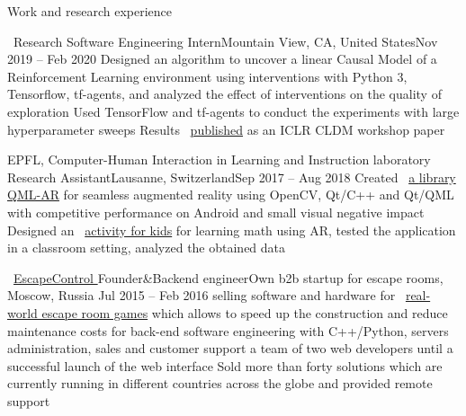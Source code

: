 \documentclass{resume} %
\newcommand*{\img}[1]{%
	\raisebox{-.02\baselineskip}{%
		\texttt{[image: \#1]}%
	}%
}
\newcommand*{\emoji}[1]{\img{./emoji/\imgpref#1.png}}
\newcommand*{\mybold}[1]{{\color{pinkunderline} #1}}
\def\imgpref{bleak-}
\newcommand{\mylink}{{\color{gray}\faExternalLink}}
\begin{document}
\begin{rSection}{Work and research experience}
	\begin{rSubsection}{{\large\vspace*{-0.7mm}\google}\ Research \emoji{flag-us}}{Software Engineering Intern}{Mountain View, CA, United States}{Nov 2019 -- Feb 2020}
		\myitem Designed an algorithm to uncover a linear \mybold{Causal Model} of a \mybold{Reinforcement Learning} environment using interventions with \mybold{Python 3, Tensorflow, tf-agents}, and analyzed the effect of interventions on the quality of exploration
		\myitem Used TensorFlow and tf-agents to conduct the experiments with large hyperparameter sweeps
		\myitem Results \mylink~\href{https://arxiv.org/abs/2002.05217}{published} as an ICLR CLDM workshop paper
	\end{rSubsection}

	\begin{rSubsection}{EPFL, Computer-Human Interaction in Learning and Instruction laboratory \emoji{flag-ch}}{Research Assistant}{Lausanne, Switzerland}{Sep 2017 -- Aug 2018}
		\myitem Created \mylink~\href{https://github.com/chili-epfl/qml-ar}{a \mybold{library} QML-AR} for seamless \mybold{augmented reality} using \mybold{OpenCV, Qt/C++ and Qt/QML} with competitive performance on Android and small visual negative impact
		\myitem Designed an \mylink~\href{https://youtu.be/B4-2qYsAKH4}{activity for kids} for learning math using AR, tested the application in a classroom setting, analyzed the obtained data
	\end{rSubsection}


	\begin{rSubsection}{\mylink~\href{http://escape-control.com}{EscapeControl \emoji{old-key}}}{Founder\&Backend engineer}{Own b2b startup for escape rooms, Moscow, Russia \emoji{flag-ru}}{Jul 2015 -- Feb 2016}
		\myitem \mybold{Created a startup} selling software and hardware for \mylink~\href{https://www.youtube.com/watch?v=kXbubjs7aTA}{real-world escape room games} which allows to speed up the construction and reduce maintenance costs
		\myitem \mybold{Responsible} for back-end software engineering with \mybold{C++/Python}, servers administration, sales and customer support
		\myitem \mybold{Managed} a team of two web developers until a successful launch of the web interface
		\myitem Sold more than forty solutions which are currently running in different countries across the globe and provided remote support
	\end{rSubsection}


\end{rSection}
\end{document}

